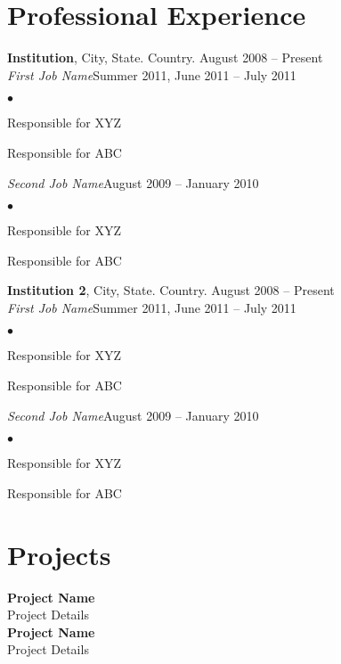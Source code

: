 \documentclass[margin,line]{res}
\newenvironment{list2}{
  \begin{list}{$\bullet$}{%
      \setlength{\itemsep}{0in}
      \setlength{\parsep}{0in} \setlength{\parskip}{0in}
      \setlength{\topsep}{0in} \setlength{\partopsep}{0in}
      \setlength{\leftmargin}{0.2in}}}{\end{list}}
\begin{document}
\begin{resume}
\section{\sc Professional Experience}
{\bf Institution}, City, State. Country. \hfill{August 2008 -- Present}\\
{\em First Job Name}\hfill {Summer 2011, June 2011 -- July 2011}\\
\begin{list2} %
\item Responsible for XYZ \\
\item Responsible for ABC\\
\end{list2}
{\em Second Job Name}\hfill {August 2009 -- January 2010}\\
\begin{list2} %
\item Responsible for XYZ \\
\item Responsible for ABC\\
\end{list2}
{\bf Institution 2}, City, State. Country. \hfill{August 2008 -- Present}\\
{\em First Job Name}\hfill {Summer 2011, June 2011 -- July 2011}\\
\begin{list2} %
\item Responsible for XYZ \\
\item Responsible for ABC\\
\end{list2}
{\em Second Job Name}\hfill {August 2009 -- January 2010}\\
\begin{list2} %
\item Responsible for XYZ \\
\item Responsible for ABC\\
\end{list2}
\section{\sc Projects}
{\bf Project Name}\\
Project Details\\

{\bf Project Name}\\
Project Details\\


\end{resume}
\end{document}

